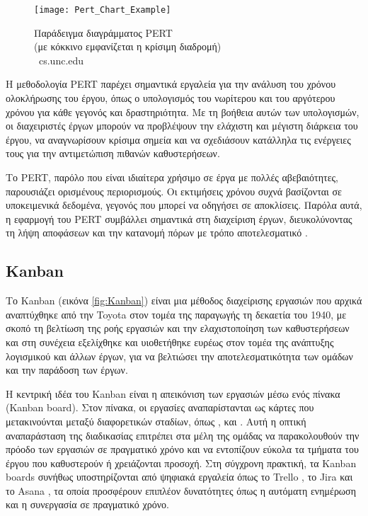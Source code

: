             \begin{figure}[h!] \noindent \centering
                \texttt{[image: Pert\_Chart\_Example]}
                \caption{\centering Παράδειγμα διαγράμματος PERT \\ (με κόκκινο εμφανίζεται η κρίσιμη διαδρομή) \\ {\footnotesize \textcopyright\ cs.unc.edu}}
                \label{fig:PertChartExample}
            \end{figure}

            Η μεθοδολογία PERT παρέχει σημαντικά εργαλεία για την ανάλυση του χρόνου ολοκλήρωσης του έργου, όπως ο υπολογισμός του νωρίτερου και του αργότερου χρόνου για κάθε γεγονός και δραστηριότητα. Με τη βοήθεια αυτών των υπολογισμών, οι διαχειριστές έργων μπορούν να προβλέψουν την ελάχιστη και μέγιστη διάρκεια του έργου, να αναγνωρίσουν κρίσιμα σημεία και να σχεδιάσουν κατάλληλα τις ενέργειες τους για την αντιμετώπιση πιθανών καθυστερήσεων.

            Το PERT, παρόλο που είναι ιδιαίτερα χρήσιμο σε έργα με πολλές αβεβαιότητες, παρουσιάζει ορισμένους περιορισμούς. Οι εκτιμήσεις χρόνου συχνά βασίζονται σε υποκειμενικά δεδομένα, γεγονός που μπορεί να οδηγήσει σε αποκλίσεις. Παρόλα αυτά, η εφαρμογή του PERT συμβάλλει σημαντικά στη διαχείριση έργων, διευκολύνοντας τη λήψη αποφάσεων και την κατανομή πόρων με τρόπο αποτελεσματικό \cite{ProjectManagement21stCentury}.


        \subsection{Kanban} \label{subsec:Kanban}
            Το Kanban (εικόνα \ref{fig:Kanban}) είναι μια μέθοδος διαχείρισης εργασιών που αρχικά αναπτύχθηκε από την Toyota στον τομέα της παραγωγής τη δεκαετία του 1940, με σκοπό τη βελτίωση της ροής εργασιών και την ελαχιστοποίηση των καθυστερήσεων και στη συνέχεια εξελίχθηκε και υιοθετήθηκε ευρέως στον τομέα της ανάπτυξης λογισμικού και άλλων έργων, για να βελτιώσει την αποτελεσματικότητα των ομάδων και την παράδοση των έργων.

            Η κεντρική ιδέα του Kanban είναι η απεικόνιση των εργασιών μέσω ενός πίνακα (Kanban board). Στον πίνακα, οι εργασίες αναπαρίστανται ως κάρτες που μετακινούνται μεταξύ διαφορετικών σταδίων, όπως ,  και . Αυτή η οπτική αναπαράσταση της διαδικασίας επιτρέπει στα μέλη της ομάδας να παρακολουθούν την πρόοδο των εργασιών σε πραγματικό χρόνο και να εντοπίζουν εύκολα τα τμήματα του έργου που καθυστερούν ή χρειάζονται προσοχή. Στη σύγχρονη πρακτική, τα Kanban boards συνήθως υποστηρίζονται από ψηφιακά εργαλεία όπως το Trello \cite{Trello}, το Jira \cite{Jira} και το Asana \cite{Asana}, τα οποία προσφέρουν επιπλέον δυνατότητες όπως η αυτόματη ενημέρωση και η συνεργασία σε πραγματικό χρόνο.

